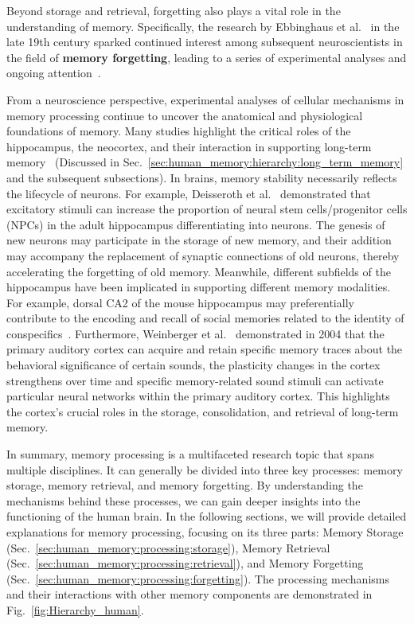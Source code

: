 \documentclass[journal,hideappendix]{vgtc}
\begin{document}
Beyond storage and retrieval, forgetting also plays a vital role in the understanding of memory. Specifically, the research by Ebbinghaus et al.~\cite{ebbinghaus1885memory} in the late 19th century sparked continued interest among subsequent neuroscientists in the field of \textbf{memory forgetting}, leading to a series of experimental analyses and ongoing attention~\cite{jost1897law, wixted1997genuine, anderson1997memory}.

From a neuroscience perspective, experimental analyses of cellular mechanisms in memory processing continue to uncover the anatomical and physiological foundations of memory. Many studies highlight the critical roles of the hippocampus, the neocortex, and their interaction in supporting long-term memory~\cite{marr1991simple,lavenex2000hippocampal,martin2001semantic,ji2007coordinated,o2014complementary,censor2014cortico} (Discussed in Sec.~\ref{sec:human_memory:hierarchy:long_term_memory} and the subsequent subsections). In brains, memory stability necessarily reflects the lifecycle of neurons. For example, Deisseroth et al.~\cite{deisseroth2004excitation} demonstrated that excitatory stimuli can increase the proportion of neural stem cells/progenitor cells (NPCs) in the adult hippocampus differentiating into neurons. The genesis of new neurons may participate in the storage of new memory, and their addition may accompany the replacement of synaptic connections of old neurons, thereby accelerating the forgetting of old memory. Meanwhile, different subfields of the hippocampus have been implicated in supporting different memory modalities. For example, dorsal CA2 of the mouse hippocampus may preferentially contribute to the encoding and recall of social memories related to the identity of conspecifics~\cite{meira2018hippocampal}.  
Furthermore, Weinberger et al.~\cite{weinberger2004specific} demonstrated in 2004 that the primary auditory cortex can acquire and retain specific memory traces about the behavioral significance of certain sounds, the plasticity changes in the cortex strengthens over time and specific memory-related sound stimuli can activate particular neural networks within the primary auditory cortex. This highlights the cortex’s crucial roles in the storage, consolidation, and retrieval of long-term memory.

In summary, memory processing is a multifaceted research topic that spans multiple disciplines. It can generally be divided into three key processes: memory storage, memory retrieval, and memory forgetting. By understanding the mechanisms behind these processes, we can gain deeper insights into the functioning of the human brain.
In the following sections, we will provide detailed explanations for memory processing, focusing on its three parts: Memory Storage (Sec.~\ref{sec:human_memory:processing:storage}), Memory Retrieval (Sec.~\ref{sec:human_memory:processing:retrieval}), and Memory Forgetting (Sec.~\ref{sec:human_memory:processing:forgetting}).
The processing mechanisms and their interactions with other memory components are demonstrated in Fig.~\ref{fig:Hierarchy_human}.
\end{document}
